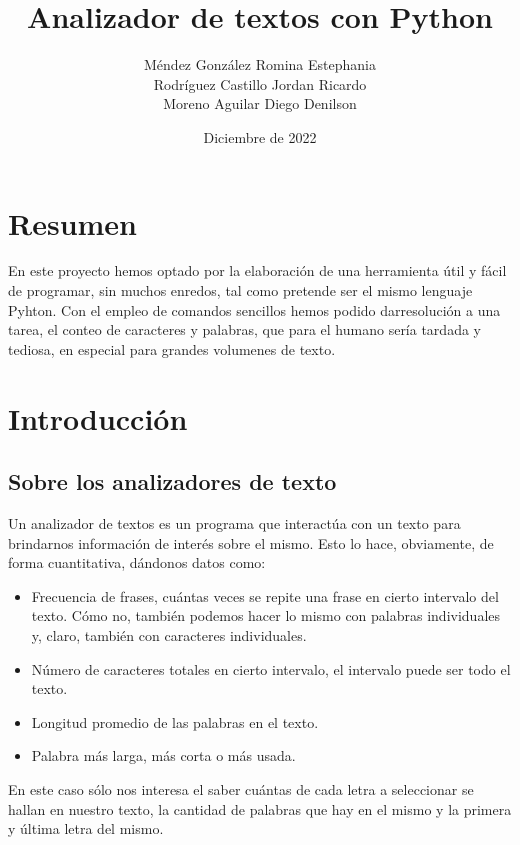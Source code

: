 \documentclass[15pt]{article}
\title{\textbf{Analizador de textos con Python}}
\author{Méndez González Romina Estephania\\
Rodríguez Castillo Jordan Ricardo\\
Moreno Aguilar Diego Denilson}
\date{Diciembre de 2022}
\begin{document}
\maketitle

\section*{\Large{Resumen}}

En este proyecto hemos optado por la elaboración de una herramienta útil y fácil de programar, sin muchos enredos, tal como pretende ser el mismo lenguaje Pyhton. Con el empleo de comandos sencillos hemos podido darresolución a una tarea, el conteo de caracteres y palabras, que para el humano sería tardada y tediosa, en especial para grandes volumenes de texto.

\section*{\Large{Introducción}}

\subsection*{Sobre los analizadores de texto}

Un analizador de textos es un programa que interactúa con un texto para brindarnos información de interés sobre el mismo. Esto lo hace, obviamente, de forma cuantitativa, dándonos datos como:

\begin{itemize}

    \item Frecuencia de frases, cuántas veces se repite una frase en cierto intervalo del texto. Cómo no, también podemos hacer lo mismo con palabras individuales y, claro, también con caracteres individuales.
    \item Número de caracteres totales en cierto intervalo, el intervalo puede ser todo el texto.
    \item Longitud promedio de las palabras en el texto.
    \item Palabra más larga, más corta o más usada.
    
\end{itemize}

En este caso sólo nos interesa el saber cuántas de cada letra a seleccionar se hallan en nuestro texto, la cantidad de palabras que hay en el mismo y la primera y última letra del mismo.
\end{document}
